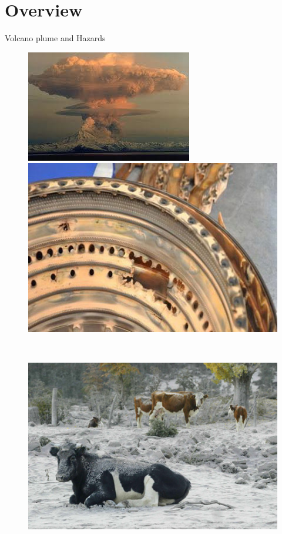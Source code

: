 \documentclass{beamer}
\begin{document}
\section{Overview}
\begin{frame}{Volcano plume and Hazards}
\noindent

\begin{figure}[!t]
\centering
\begin{minipage}{.49\textwidth}
\center
\includegraphics[width=.90\textwidth]{./PPT/Plume_pic}
\end{minipage}
\begin{minipage}{.49\textwidth}
\center
\includegraphics[width=.70\textwidth]{./PPT/BA-engine}
\end{minipage}
\\
\begin{minipage}{.32\textwidth}
\center
\includegraphics[width=.95\textwidth]{./PPT/Ash_community}

\end{minipage}
\end{figure}
\end{frame}
\end{document}
